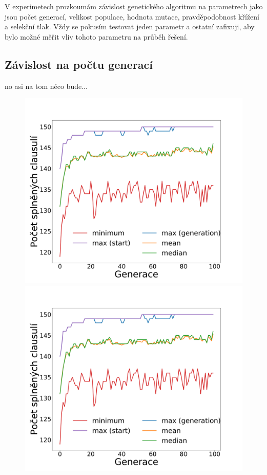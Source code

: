 \documentclass[11pt]{article}
\begin{document}
V experimetech prozkoumám závislost genetického algoritmu na parametrech jako jsou počet generací, velikost populace, hodnota mutace, pravděpodobnost křížení a selekční tlak. Vždy se pokusím testovat jeden parametr a ostatní zafixuji, aby bylo možné měřit vliv tohoto parametru na průběh řešení. 

\subsection{Závislost na počtu generací}
no asi na tom něco bude...
 


\begin{figure}
	\centering
    \begin{minipage}[c]{0.42\textwidth}
        \centering\includegraphics[width=\textwidth]{img/1c.pdf} 
    \end{minipage}
    \begin{minipage}[c]{0.42\textwidth}
        \centering \includegraphics[width=\textwidth]{img/1c.pdf} 

\end{minipage}
\end{figure}
\end{document}
